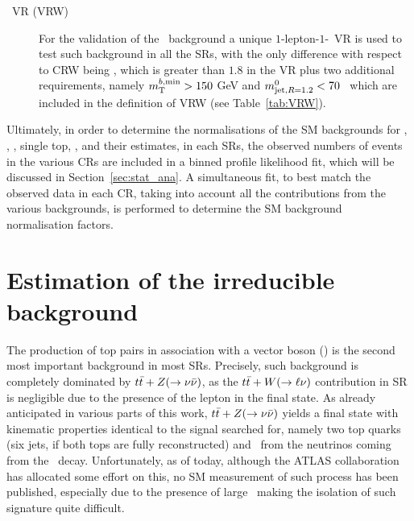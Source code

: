 \begin{description}
				\item [\Wjets\ VR (VRW)] For the validation of the \Wjets\ background a unique $1$-lepton-$1$-\bj\ \ac{VR} is used to test such background in all the \acp{SR}, with the only difference with respect to CRW being \mindrblep, which is greater than $1.8$ in the \ac{VR} plus two additional requirements, namely $m_{\mathrm{T}}^{b,\mathrm{min}}>150$ GeV and $m^{0}_{\mathrm{jet,}R=1.2}<70$ \GeV\ which are included in the definition of VRW (see Table~\ref{tab:VRW}).

			\end{description}

		Ultimately, in order to determine the normalisations of the \ac{SM} backgrounds for \Zboson, \ttbar, \Wboson, single top, \ttZ, and their estimates, in each \acp{SR}, the observed numbers of events in the various \acp{CR} are included in a binned profile likelihood fit, which will be discussed in Section~\ref{sec:stat_ana}. A simultaneous fit, to best match the observed data in each \ac{CR}, taking into account all the contributions from the various backgrounds, is performed to determine the \ac{SM} background normalisation factors. 


	\section{Estimation of the \protect{\ttZ} irreducible background}
	\label{sec:ddbkgest}

		The production of top pairs in association with a vector boson (\ttV) is the second most important background in most \acp{SR}. Precisely, such background is completely dominated by $t\bar{t}+Z(\rightarrow \nu\bar{\nu})$, as the $t\bar{t}+W(\rightarrow \ell \nu)$ contribution in \ac{SR} is negligible due to the presence of the lepton in the final state. As already anticipated in various parts of this work, $t\bar{t}+Z(\rightarrow \nu\bar{\nu})$ yields a final state with kinematic properties identical to the signal searched for, namely two top quarks (six jets, if both tops are fully reconstructed) and \met\ from the neutrinos coming from the \Zboson\ decay. Unfortunately, as of today, although the \ac{ATLAS} collaboration has allocated some effort on this, no \ac{SM} measurement of such process has been published, especially due to the presence of large \met\ making the isolation of such signature quite difficult.


